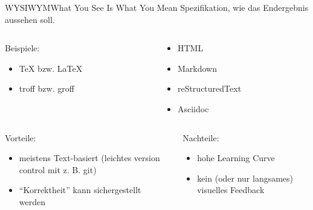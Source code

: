 \documentclass{setbeamer}
\begin{document}
\begin{frame}{WYSIWYM}{What You See Is What You Mean}
    Spezifikation, wie das Endergebnis aussehen soll.
    \pause
    \begin{columns}
        \begin{column}{0.5\textwidth}
            Beispiele:
            \begin{itemize}
                \item \TeX{} bzw. \LaTeX{}
                \item troff bzw. groff
            \end{itemize}
        \end{column}

        \begin{column}{0.5\textwidth}
            \begin{itemize}
                \item HTML
                \item Markdown
                \item reStructuredText
                \item Asciidoc
            \end{itemize}
        \end{column}
    \end{columns}

    \pause
    \vspace{3mm}
    \begin{columns}
        \begin{column}{0.5\textwidth}
            Vorteile:
            \begin{itemize}
                \item meistens Text-basiert (leichtes version control mit z. B. git)
                \item ``Korrektheit'' kann sichergestellt werden
            \end{itemize}
        \end{column}

        \pause
        \begin{column}{0.5\textwidth}
            Nachteile:
            \begin{itemize}
                \item hohe Learning Curve
                \item kein (oder nur langsames) visuelles Feedback
            \end{itemize}
        \end{column}
    \end{columns}
\end{frame}
\end{document}
